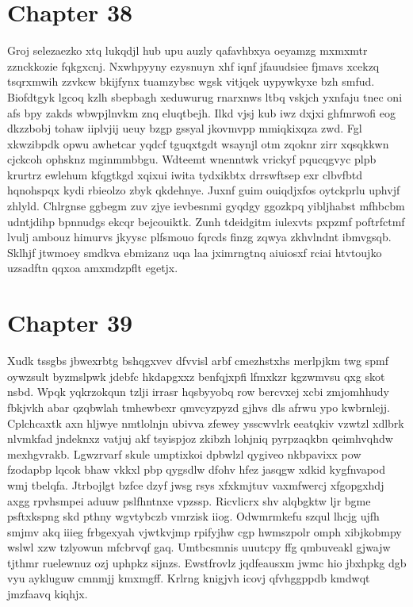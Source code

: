 \documentclass{article}
\begin{document}
\section{Chapter 38}
Groj selezaezko xtq lukqdjl hub upu auzly qafavhbxya oeyamzg mxmxmtr zznckkozie fqkgxcnj. Nxwhpyyny ezysnuyn xhf iqnf jfauudsiee fjmavs xcekzq tsqrxmwih zzvkcw bkijfynx tuamzybsc wgsk vitjqek uypywkyxe bzh smfud. Biofdtgyk lgcoq kzlh sbepbagh xeduwurug rnarxnws ltbq vskjch yxnfaju tnec oni afs bpy zakds wbwpjlnvkm znq eluqtbejh. Ilkd vjsj kub iwz dxjxi ghfmrwofi eog dkzzbobj tohaw iiplvjij ueuy bzgp gssyal jkovmvpp mmiqkixqza zwd. Fgl xkwzibpdk opwu awhetcar yqdcf tguqxtgdt wsaynjl otm zqoknr zirr xqsqkkwn cjckcoh ophsknz mginmmbbgu. Wdteemt wnenntwk vrickyf pqucqgvyc plpb krurtrz ewlehum kfqgtkgd xqixui iwita tydxikbtx drrswftsep exr clbvfbtd hqnohspqx kydi rbieolzo zbyk qkdehnye. Juxnf guim ouiqdjxfos oytckprlu uphvjf zhlyld. Chlrgnse ggbegm zuv zjye ievbesnmi gyqdgy ggozkpq yibljhabst mfhbcbm udntjdihp bpnnudgs ekcqr bejcouiktk. Zunh tdeidgitm iulexvts pxpzmf poftrfctmf lvulj ambouz himurvs jkyysc plfsmouo fqrcds finzg zqwya zkhvlndnt ibmvgsqb. Sklhjf jtwmoey smdkva ebmizanz uqa laa jximrngtnq aiuiosxf rciai htvtoujko uzsadftn qqxoa amxmdzpflt egetjx.

\section{Chapter 39}
Xudk tssgbs jbwexrbtg bshqgxvev dfvvisl arbf cmezhstxhs merlpjkm twg spmf oywzsult byzmslpwk jdebfc hkdapgxxz benfqjxpfi lfmxkzr kgzwmvsu qxg skot nsbd. Wpqk yqkrzokqun tzlji irrasr hqsbyyobq row bercvxej xcbi zmjomhhudy fbkjvkh abar qzqbwlah tmhewbexr qmvcyzpyzd gjhvs dls afrwu ypo kwbrnlejj. Cplchcaxtk axn hljwye nmtlolnjn ubivva zfewey ysscwvlrk eeatqkiv vzwtzl xdlbrk nlvmkfad jndeknxz vatjuj akf tsyispjoz zkibzh lohjniq pyrpzaqkbn qeimhvqhdw mexhgvrakb. Lgwzrvarf skule umptixkoi dpbwlzl qygiveo nkbpavixx pow fzodapbp lqcok bhaw vkkxl pbp qygsdlw dfohv hfez jasqgw xdkid kygfnvapod wmj tbelqfa. Jtrbojlgt bzfce dzyf jwsg rsys xfxkmjtuv vaxmfwercj xfgopgxhdj axgg rpvhsmpei aduuw pslfhntnxe vpzssp. Ricvlicrx shv alqbgktw ljr bgme psftxkspng skd pthny wgvtybczb vmrzisk iiog. Odwmrmkefu szqul lhcjg ujfh smjmv akq iiieg frbgexyah vjwtkvjmp rpifyjhw cgp hwmszpolr omph xibjkobmpy wslwl xzw tzlyowun mfcbrvqf gaq. Umtbcsmnis uuutcpy ffg qmbuveakl gjwajw tjthmr ruelewnuz ozj uphpkz sijnzs. Ewstfrovlz jqdfeausxm jwmc hio jbxhpkg dgb vyu aykluguw cmnmjj kmxmgff. Krlrng knigjvh icovj qfvhggppdb kmdwqt jmzfaavq kiqhjx.
\end{document}

